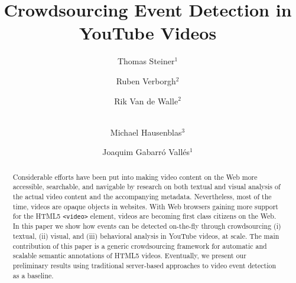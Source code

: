 \documentclass[runningheads,a4paper]{llncs}
\begin{document}
\mainmatter

\title{Crowdsourcing Event Detection in YouTube Videos}


%
%
\author{Thomas Steiner$^{1}$ \and Ruben Verborgh$^{2}$ \and Rik Van de Walle$^{2}$ \and \\Michael Hausenblas$^{3}$ \and Joaquim Gabarr\'{o} Vall\'{e}s$^{1}$}
%

\maketitle

\begin{abstract}
Considerable efforts have been put into making video content on the Web more accessible, searchable, and navigable by research on both textual and visual analysis of the actual video content and the accompanying metadata. Nevertheless, most of the time, videos are opaque objects in websites. With Web browsers gaining more support for the HTML5 \texttt{<video>} element, videos are becoming first class citizens on the Web. In this paper we show how events can be detected on-the-fly through crowdsourcing (i) textual, (ii) visual, and (iii) behavioral analysis in YouTube videos, at scale. The main contribution of this paper is a generic crowdsourcing framework for automatic and scalable semantic annotations of HTML5 videos. Eventually, we present our preliminary results using traditional server-based approaches to video event detection as a baseline. 
\end{abstract}
\end{document}
